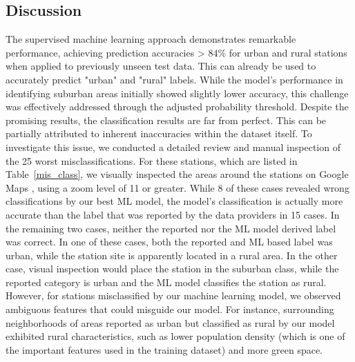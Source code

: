 \documentclass[gmd, manuscript]{copernicus}
\begin{document}
\subsection{Discussion}
The supervised machine learning approach demonstrates remarkable performance, achieving prediction accuracies > 84\% for urban and rural stations when applied to previously unseen test data. This can already be used to accurately predict "urban" and "rural" labels.  While the model's performance in identifying suburban areas initially showed slightly lower accuracy, this challenge was effectively addressed through the adjusted probability threshold. 
Despite the promising results, the classification results are far from perfect. This can be partially attributed to inherent inaccuracies within the dataset itself. To investigate this issue, we conducted a detailed review and manual inspection of the 25 worst misclassifications. For these stations, which are listed in Table~\ref{mis_class}, we visually inspected the areas around the stations on Google Maps \cite{mehta2019google}, using a zoom level of 11 or greater. While 8 of these cases revealed wrong classifications by our best ML model, the model's classification is actually more accurate than the label that was reported by the data providers in 15 cases. In the remaining two cases, neither the reported nor the ML model derived label was correct. In one of these cases, both the reported and ML based label was urban, while the station site is apparently located in a rural area. In the other case, visual inspection would place the station in the suburban class, while the reported category is urban and the ML model classifies the station as rural. However, for stations misclassified by our machine learning model, we observed ambiguous features that could misguide our model. For instance, surrounding neighborhoods of areas reported as urban but classified as rural by our model exhibited rural characteristics, such as lower population density (which is one of the important features used in the training dataset) and more green space.
\end{document}
